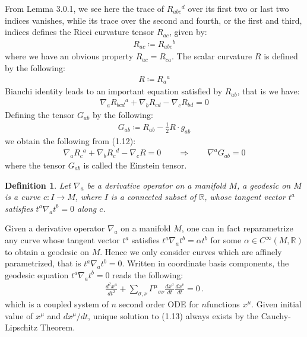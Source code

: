 \documentclass[11pt, onesided]{book}
\theoremstyle{break}
\theoremstyle{break}
\newtheorem{defn}{Definition}[thm]
\newcommand{\R}{\mathbb{R}}
\begin{document}
From Lemma 3.0.1, we see here the trace of $R_{abc}{}^d$ over its first two or last two indices vanishes, while its trace over the second and fourth, or the first and third, indices defines the Ricci curvature tensor $R_{ac}$, given by:
\begin{align*}
R_{ac} \coloneqq R_{abc}{}^b
\end{align*}
where we have an obvious property $R_{ac} = R_{ca}$. The scalar curvature $R$ is defined by the following:
\begin{align*}
R\coloneqq R_a{}^{a}
\end{align*}
Bianchi identity leads to an important equation satisfied by $R_{ab}$, that is we have:
\begin{align}
\nabla_a R_{bcd}{}^a + \nabla_b R_{cd} - \nabla_c R_{bd} = 0
\end{align}
Defining the tensor $G_{ab}$ by the following:
\begin{align*}
G_{ab}\coloneqq R_{ab} - \frac{1}{2}R\cdot g_{ab}
\end{align*}
we obtain the following from (1.12):
\begin{align*}
\nabla_a R_c{}^a + \nabla_b R_c{}^d - \nabla_c R = 0\qquad\Rightarrow \qquad  \nabla^a G_{ab} = 0
\end{align*}
where the tensor $G_{ab}$ is called the Einstein tensor. \\

\begin{defn}
Let $\nabla_a$ be a derivative operator on a manifold $M$, a geodesic on $M$ is a curve $c:I \to M$, where $I$ is a connected subset of $\R$, whose tangent vector $t^a$ satisfies $t^a\nabla_a t^b = 0$ along $c$. 
\end{defn}

Given a derivative operator $\nabla_a$ on a manifold $M$, one can in fact reparametrize any curve whose tangent vector $t^a$ satisfies $t^a \nabla_a t^b = \alpha  t^b$ for some $\alpha \in C^\infty (M, \R)$ to obtain a geodesic on $M$. Hence we only consider curves which are affinely parametrized, that is $t^a\nabla_a t^b = 0$. Written in coordinate basis components, the geodesic equation $t^a \nabla_a t^b = 0$ reads the following:
\begin{align}
\frac{d^2 x^\mu}{dt^2} + \sum_{\sigma, \nu}\Gamma^{\mu}{}_{\sigma \nu} \frac{dx^\sigma}{dt}\frac{dx^\nu}{dt} = 0\, .
\end{align}
which is a coupled system of $n$ second order ODE for $n$functions $x^\mu$. Given initial value of $x^\mu$ and $dx^\mu/dt$, unique solution to (1.13) always exists by the Cauchy-Lipschitz Theorem. \\
\end{document}
